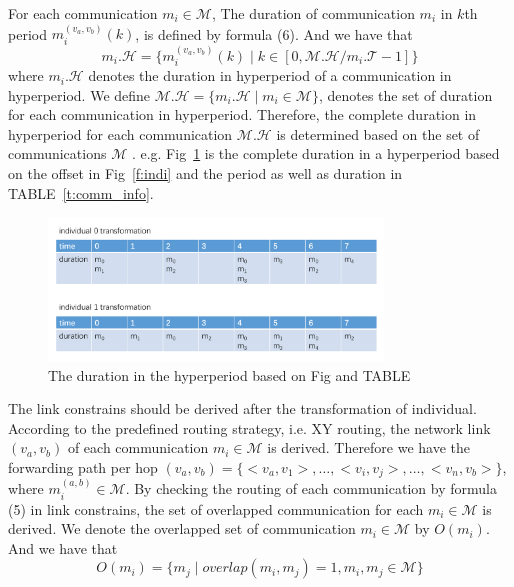 \documentclass[conference]{IEEEtran}
\begin{document}
For each communication $m_{i}\in \mathcal{M}$, The duration of communication $m_{i}$ in $\mathit{k}$th period ${m_{i}^{(v_{a},v_{b})}}(k)$, is defined by formula (6). And we have that
\begin{equation}
m_{i}.\mathcal{H} = \{ {m_{i}^{(v_{a},v_{b})}}(k) \mid k \in [0, \mathcal{M.H} / m_{i}.\mathcal{T} - 1] \}
\end{equation}
where $m_{i}.\mathcal{H}$ denotes the duration in hyperperiod of a communication in hyperperiod.
We define $\mathcal{M.H}=\{ m_{i}.\mathcal{H} \mid m_{i}\in \mathcal{M} \}$, denotes the set of duration for each communication in hyperperiod. 
Therefore, the complete duration in hyperperiod for each communication $\mathcal{M.H}$ is determined based on the set of communications $\mathcal{M}$ . e.g. Fig~\ref{f:duration} is the complete duration in a hyperperiod based on the offset in Fig~\ref{f:indi} and the period as well as duration in TABLE~\ref{t:comm_info}.

\begin{figure}[!t]
	\centering
	\includegraphics[width=3.5in]{picture/individual_transformation.pdf}
	\caption{The duration in the hyperperiod based on Fig and TABLE}
	\label{f:duration}
\end{figure}

The link constrains should be derived after the transformation of individual. According to the predefined routing strategy, i.e. XY routing, the network link $(v_{a},v_{b})$ of each communication $m_{i}\in\mathcal{M}$ is derived. Therefore we have the forwarding path per hop $ (v_{a},v_{b})=\{ <v_{a},v_{1}> ,\dots, <v_{i},v_{j}> ,\dots, <v_{n},v_{b}> \} $, where $m_{i}^{(a,b)}\in\mathcal{M}$. By checking the routing of each communication by formula (5) in link constrains, the set of overlapped communication for each $m_{i}\in\mathcal{M}$ is derived. We denote the overlapped set of communication $m_{i}\in \mathcal{M}$ by $O(m_i)$. And we have that
\begin{equation}
	O(m_i) = \{ m_j \mid overlap(m_i,m_j)=1,m_i,m_j\in\mathcal{M}  \}
\end{equation}
\end{document}
